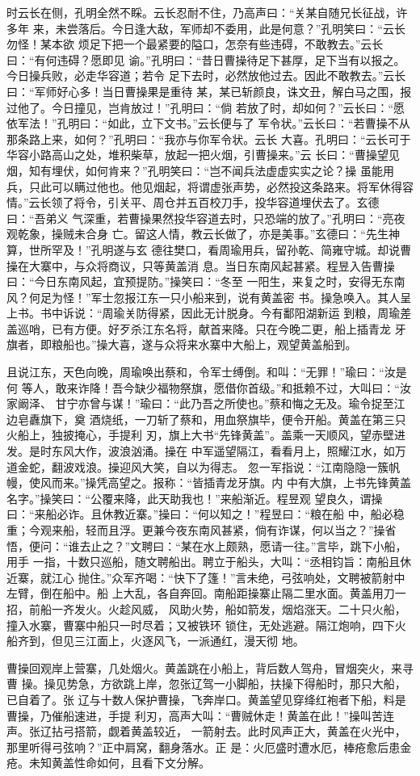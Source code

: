 时云长在侧，孔明全然不睬。云长忍耐不住，乃高声曰：“关某自随兄长征战，许多年
来，未尝落后。今日逢大敌，军师却不委用，此是何意？”孔明笑曰：“云长勿怪！某本欲
烦足下把一个最紧要的隘口，怎奈有些违碍，不敢教去。”云长曰：“有何违碍？愿即见
谕。”孔明曰：“昔日曹操待足下甚厚，足下当有以报之。今日操兵败，必走华容道；若令
足下去时，必然放他过去。因此不敢教去。”云长曰：“军师好心多！当日曹操果是重待
某，某已斩颜良，诛文丑，解白马之围，报过他了。今日撞见，岂肯放过！”孔明曰：“倘
若放了时，却如何？”云长曰：“愿依军法！”孔明曰：“如此，立下文书。”云长便与了
军令状。”云长曰：“若曹操不从那条路上来，如何？”孔明曰：“我亦与你军令状。云长
大喜。孔明曰：“云长可于华容小路高山之处，堆积柴草，放起一把火烟，引曹操来。”云
长曰：“曹操望见烟，知有埋伏，如何肯来？”孔明笑曰：“岂不闻兵法虚虚实实之论？操
虽能用兵，只此可以瞒过他也。他见烟起，将谓虚张声势，必然投这条路来。将军休得容
情。”云长领了将令，引关平、周仓并五百校刀手，投华容道埋伏去了。玄德曰：“吾弟义
气深重，若曹操果然投华容道去时，只恐端的放了。”孔明曰：“亮夜观乾象，操贼未合身
亡。留这人情，教云长做了，亦是美事。”玄德曰：“先生神算，世所罕及！”孔明遂与玄
德往樊口，看周瑜用兵，留孙乾、简雍守城。却说曹操在大寨中，与众将商议，只等黄盖消
息。当日东南风起甚紧。程昱入告曹操曰：“今日东南风起，宜预提防。”操笑曰：“冬至
一阳生，来复之时，安得无东南风？何足为怪！”军士忽报江东一只小船来到，说有黄盖密
书。操急唤入。其人呈上书。书中诉说：“周瑜关防得紧，因此无计脱身。今有鄱阳湖新运
到粮，周瑜差盖巡哨，已有方便。好歹杀江东名将，献首来降。只在今晚二更，船上插青龙
牙旗者，即粮船也。”操大喜，遂与众将来水寨中大船上，观望黄盖船到。

且说江东，天色向晚，周瑜唤出蔡和，令军士缚倒。和叫：“无罪！”瑜曰：“汝是何
等人，敢来诈降！吾今缺少福物祭旗，愿借你首级。”和抵赖不过，大叫曰：“汝家阚泽、
甘宁亦曾与谋！”瑜曰：“此乃吾之所使也。”蔡和悔之无及。瑜令捉至江边皂纛旗下，奠
酒烧纸，一刀斩了蔡和，用血祭旗毕，便令开船。黄盖在第三只火船上，独披掩心，手提利
刃，旗上大书“先锋黄盖”。盖乘一天顺风，望赤壁进发。是时东风大作，波浪汹涌。操在
中军遥望隔江，看看月上，照耀江水，如万道金蛇，翻波戏浪。操迎风大笑，自以为得志。
忽一军指说：“江南隐隐一簇帆幔，使风而来。”操凭高望之。报称：“皆插青龙牙旗。内
中有大旗，上书先锋黄盖名字。”操笑曰：“公覆来降，此天助我也！”来船渐近。程昱观
望良久，谓操曰：“来船必诈。且休教近寨。”操曰：“何以知之！”程昱曰：“粮在船
中，船必稳重；今观来船，轻而且浮。更兼今夜东南风甚紧，倘有诈谋，何以当之？”操省
悟，便问：“谁去止之？”文聘曰：“某在水上颇熟，愿请一往。”言毕，跳下小船，用手
一指，十数只巡船，随文聘船出。聘立于船头，大叫：“丞相钧旨：南船且休近寨，就江心
抛住。”众军齐喝：“快下了篷！”言未绝，弓弦响处，文聘被箭射中左臂，倒在船中。船
上大乱，各自奔回。南船距操寨止隔二里水面。黄盖用刀一招，前船一齐发火。火趁风威，
风助火势，船如箭发，烟焰涨天。二十只火船，撞入水寨，曹寨中船只一时尽着；又被铁环
锁住，无处逃避。隔江炮响，四下火船齐到，但见三江面上，火逐风飞，一派通红，漫天彻
地。

曹操回观岸上营寨，几处烟火。黄盖跳在小船上，背后数人驾舟，冒烟突火，来寻曹
操。操见势急，方欲跳上岸，忽张辽驾一小脚船，扶操下得船时，那只大船，已自着了。张
辽与十数人保护曹操，飞奔岸口。黄盖望见穿绛红袍者下船，料是曹操，乃催船速进，手提
利刃，高声大叫：“曹贼休走！黄盖在此！”操叫苦连声。张辽拈弓搭箭，觑着黄盖较近，
一箭射去。此时风声正大，黄盖在火光中，那里听得弓弦响？”正中肩窝，翻身落水。正
是：火厄盛时遭水厄，棒疮愈后患金疮。未知黄盖性命如何，且看下文分解。